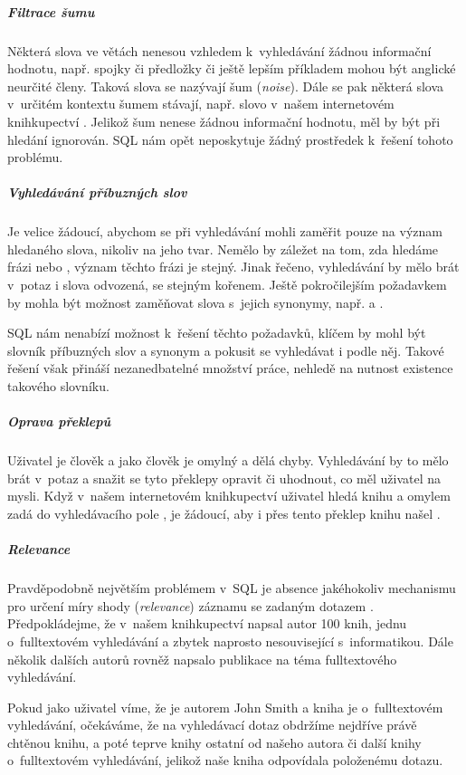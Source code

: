 \documentclass[11pt,oneside]{fithesis2}
\begin{document}
\subparagraph{Filtrace šumu}
Některá slova ve větách nenesou vzhledem k~vyhledávání žádnou informační hodnotu, např. spojky či předložky či ještě lepším příkladem mohou být anglické neurčité členy. Taková slova se nazývají šum (\emph{noise}). Dále se pak některá slova v~určitém kontextu
šumem stávají, např. slovo  v~našem internetovém knihkupectví \cite[s.~9]{HibernateSearchAction}. Jelikož šum nenese žádnou informační hodnotu, měl by být při hledání ignorován. SQL nám opět neposkytuje žádný prostředek k~řešení tohoto problému.

\subparagraph{Vyhledávání příbuzných slov}
Je velice žádoucí, abychom se při vyhledávání mohli zaměřit pouze na význam hledaného slova, nikoliv na jeho tvar. Nemělo by záležet na tom, zda hledáme frázi  nebo , význam těchto frázi
je stejný. Jinak řečeno, vyhledávání by mělo brát v~potaz i slova odvozená, se stejným kořenem. Ještě pokročilejším požadavkem by mohla být možnost zaměňovat slova s~jejich synonymy, např.  a  \cite[s.~10]{HibernateSearchAction}.

SQL nám nenabízí možnost k~řešení těchto požadavků, klíčem by mohl být slovník příbuzných slov a synonym a pokusit se vyhledávat i podle něj. Takové řešení však přináší nezanedbatelné množství práce, nehledě na nutnost existence takového slovníku.

\subparagraph{Oprava překlepů}
Uživatel je člověk a jako člověk je omylný a dělá chyby. Vyhledávání by to mělo brát v~potaz a snažit se tyto překlepy opravit či uhodnout, co měl uživatel na mysli. Když v~našem internetovém knihkupectví uživatel hledá knihu  a
omylem zadá do vyhledávacího pole , je žádoucí, aby i přes tento překlep knihu našel \cite[s.~10]{HibernateSearchAction}.

\subparagraph{Relevance}
Pravděpodobně největším problémem v~SQL je absence jakéhokoliv mechanismu pro určení míry shody (\emph{relevance}) záznamu se zadaným dotazem \cite[s.~10]{HibernateSearchAction}. Předpokládejme, že v~našem knihkupectví napsal autor  100 knih, jednu o~fulltextovém vyhledávání a zbytek naprosto nesouvisející s~informatikou. Dále několik dalších autorů rovněž napsalo publikace na téma fulltextového vyhledávání.

Pokud jako uživatel víme, že je autorem John Smith a kniha je o~fulltextovém vyhledávání, očekáváme, že na vyhledávací dotaz  obdržíme nejdříve právě chtěnou knihu, a poté teprve knihy ostatní od našeho autora či
další knihy o~fulltextovém vyhledávání, jelikož naše kniha  odpovídala položenému dotazu.
\end{document}
